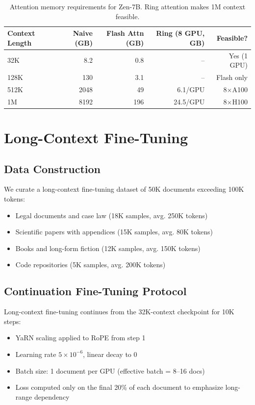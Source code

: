 \documentclass[11pt,a4paper]{article}
\begin{document}
\begin{table}[H]
\centering
\begin{tabular}{lrrrr}
\toprule
\textbf{Context Length} & \textbf{Naive (GB)} & \textbf{Flash Attn (GB)} & \textbf{Ring (8 GPU, GB)} & \textbf{Feasible?} \\
\midrule
32K & 8.2 & 0.8 & -- & Yes (1 GPU) \\
128K & 130 & 3.1 & -- & Flash only \\
512K & 2048 & 49 & 6.1/GPU & 8$\times$A100 \\
1M & 8192 & 196 & 24.5/GPU & 8$\times$H100 \\
\bottomrule
\end{tabular}
\caption{Attention memory requirements for Zen-7B. Ring attention makes 1M context feasible.}
\end{table}

\section{Long-Context Fine-Tuning}

\subsection{Data Construction}

We curate a long-context fine-tuning dataset of 50K documents exceeding 100K tokens:
\begin{itemize}
  \item Legal documents and case law (18K samples, avg. 250K tokens)
  \item Scientific papers with appendices (15K samples, avg. 80K tokens)
  \item Books and long-form fiction (12K samples, avg. 150K tokens)
  \item Code repositories (5K samples, avg. 200K tokens)
\end{itemize}

\subsection{Continuation Fine-Tuning Protocol}

Long-context fine-tuning continues from the 32K-context checkpoint for 10K steps:
\begin{itemize}
  \item YaRN scaling applied to RoPE from step 1
  \item Learning rate $5\times10^{-6}$, linear decay to 0
  \item Batch size: 1 document per GPU (effective batch = 8--16 docs)
  \item Loss computed only on the final 20\% of each document to emphasize long-range dependency
\end{itemize}
\end{document}
